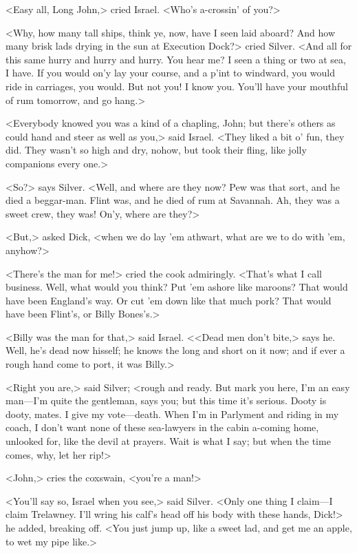 <Easy all, Long John,> cried Israel. <Who's a-crossin' of you?>

<Why, how many tall ships, think ye, now, have I seen laid aboard? And how many brisk lads drying in the sun at Execution Dock?> cried Silver. <And all for this same hurry and hurry and hurry. You hear me? I seen a thing or two at sea, I have. If you would on'y lay your course, and a p'int to windward, you would ride in carriages, you would. But not you! I know you. You'll have your mouthful of rum tomorrow, and go hang.>

<Everybody knowed you was a kind of a chapling, John; but there's others as could hand and steer as well as you,> said Israel. <They liked a bit o' fun, they did. They wasn't so high and dry, nohow, but took their fling, like jolly companions every one.>

<So?> says Silver. <Well, and where are they now? Pew was that sort, and he died a beggar-man. Flint was, and he died of rum at Savannah. Ah, they was a sweet crew, they was! On'y, where are they?>

<But,> asked Dick, <when we do lay 'em athwart, what are we to do with 'em, anyhow?>

<There's the man for me!> cried the cook admiringly. <That's what I call business. Well, what would you think? Put 'em ashore like maroons? That would have been England's way. Or cut 'em down like that much pork? That would have been Flint's, or Billy Bones's.>

<Billy was the man for that,> said Israel. <<Dead men don't bite,> says he. Well, he's dead now hisself; he knows the long and short on it now; and if ever a rough hand come to port, it was Billy.>

<Right you are,> said Silver; <rough and ready. But mark you here, I'm an easy man—I'm quite the gentleman, says you; but this time it's serious. Dooty is dooty, mates. I give my vote—death. When I'm in Parlyment and riding in my coach, I don't want none of these sea-lawyers in the cabin a-coming home, unlooked for, like the devil at prayers. Wait is what I say; but when the time comes, why, let her rip!>

<John,> cries the coxswain, <you're a man!>

<You'll say so, Israel when you see,> said Silver. <Only one thing I claim—I claim Trelawney. I'll wring his calf's head off his body with these hands, Dick!> he added, breaking off. <You just jump up, like a sweet lad, and get me an apple, to wet my pipe like.>

